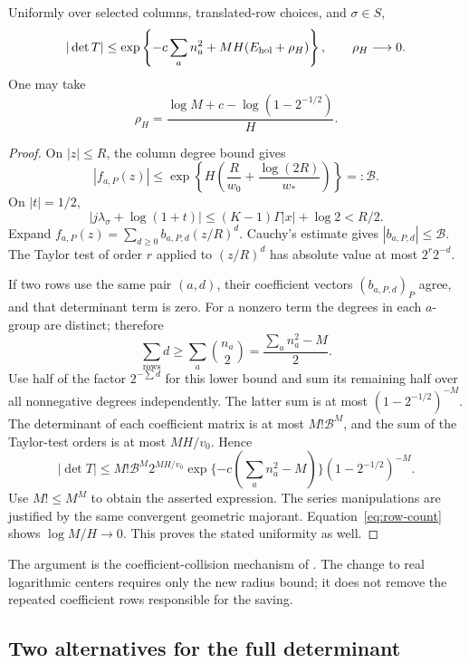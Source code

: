 \begin{lemma}\label{lem:collision}
Uniformly over selected columns, translated-row choices, and
\(\sigma\in S\),
\begin{equation}\label{eq:collision}
 |\det T|\le
  \exp\left\{-c\sum_a n_a^2+MH(E_{\rm hol}+\rho_H)\right\},
 \qquad \rho_H\longrightarrow0.
\end{equation}
One may take
\[
 \rho_H=
 \frac{\log M+c-\log(1-2^{-1/2})}{H}.
\]
\end{lemma}
\begin{proof}
On \(|z|\le R\), the column degree bound gives
\[
 |f_{a,P}(z)|
 \le\exp\left\{H\left(\frac R{w_0}
                        +\frac{\log(2R)}{w_*}\right)\right\}
 =:\mathcal B.
\]
On \(|t|=1/2\),
\[
 |j\lambda_\sigma+\log(1+t)|
 \le(K-1)\Gamma|x|+\log2<R/2.
\]
Expand \(f_{a,P}(z)=\sum_{d\ge0}b_{a,P,d}(z/R)^d\).
Cauchy's estimate gives \(|b_{a,P,d}|\le\mathcal B\).
The Taylor test of order \(r\) applied to \((z/R)^d\) has
absolute value at most \(2^r2^{-d}\).

If two rows use the same pair \((a,d)\), their coefficient vectors
\((b_{a,P,d})_P\) agree, and that determinant term is zero.
For a nonzero term the degrees in each \(a\)-group are distinct;
therefore
\[
 \sum_{\text{rows}}d\ge\sum_a\binom{n_a}{2}
                    =\frac{\sum_a n_a^2-M}{2}.
\]
Use half of the factor \(2^{-\sum d}\) for this lower bound and
sum its remaining half over all nonnegative degrees independently.
The latter sum is at most \((1-2^{-1/2})^{-M}\).
The determinant of each coefficient matrix is at most
\(M!\mathcal B^M\), and the sum of the Taylor-test orders is at most
\(MH/v_0\). Hence
\[
 |\det T|\le
 M!\mathcal B^M 2^{MH/v_0}
 \exp\{-c(\sum_a n_a^2-M)\}(1-2^{-1/2})^{-M}.
\]
Use \(M!\le M^M\) to obtain the asserted expression.
The series manipulations are justified by the same convergent
geometric majorant. Equation~\eqref{eq:row-count} shows
\(\log M/H\to0\). This proves the stated uniformity as well.
\end{proof}

The argument is the coefficient-collision mechanism of
\cite[Lemma 3.3]{OAIpi}. The change to real logarithmic centers
requires only the new radius bound; it does not remove the repeated
coefficient rows responsible for the saving.

\subsection{Two alternatives for the full determinant}


